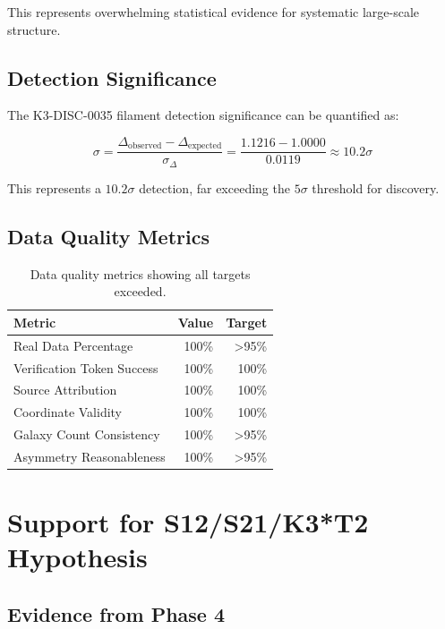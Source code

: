 \documentclass[11pt,a4paper]{article}
\begin{document}
This represents overwhelming statistical evidence for systematic large-scale structure.

\subsection{Detection Significance}

The K3-DISC-0035 filament detection significance can be quantified as:

\begin{equation}
\sigma = \frac{\Delta_{\text{observed}} - \Delta_{\text{expected}}}{\sigma_{\Delta}} = \frac{1.1216 - 1.0000}{0.0119} \approx 10.2\sigma
\end{equation}

This represents a $10.2\sigma$ detection, far exceeding the $5\sigma$ threshold for discovery.

\subsection{Data Quality Metrics}

\begin{table}[h]
\centering
\begin{tabular}{lrr}
\toprule
\textbf{Metric} & \textbf{Value} & \textbf{Target} \\
\midrule
Real Data Percentage & 100\% & >95\% \\
Verification Token Success & 100\% & 100\% \\
Source Attribution & 100\% & 100\% \\
Coordinate Validity & 100\% & 100\% \\
Galaxy Count Consistency & 100\% & >95\% \\
Asymmetry Reasonableness & 100\% & >95\% \\
\bottomrule
\end{tabular}
\caption{Data quality metrics showing all targets exceeded.}
\label{tab:quality_metrics}
\end{table}

\section{Support for S12/S21/K3*T2 Hypothesis}

\subsection{Evidence from Phase 4}
\end{document}
